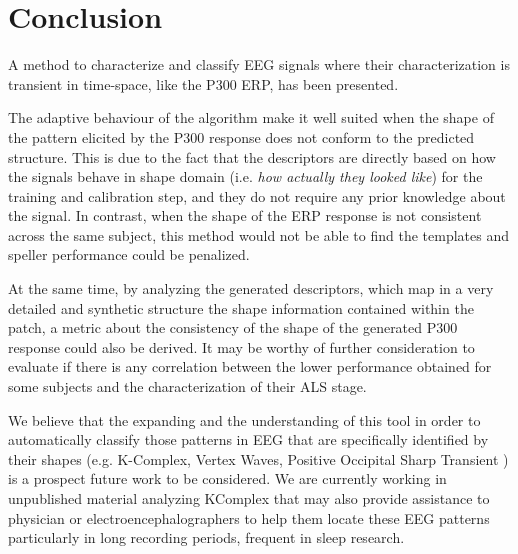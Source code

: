 \documentclass[entropy,article,submit,moreauthors,pdftex,10pt,a4paper]{mdpi}
\begin{document}
%
%
%
%
%
%
%
%

\section{Conclusion}

A method to characterize and classify EEG signals where their characterization is transient in time-space, like the P300 ERP, has been presented.   


The adaptive behaviour of the algorithm make it well suited when the shape of the pattern elicited by the P300 response does not conform to the predicted structure.  This is due to the fact that the descriptors are directly based on how the signals behave in shape domain (i.e. \textit{how actually they looked like}) for the training and calibration step, and they do not require any prior knowledge about the signal.   In contrast, when the shape of the ERP response is not consistent across the same subject, this method would not be able to find the templates and speller performance could be penalized.  

At the same time, by analyzing the generated descriptors, which map in a very detailed and synthetic structure the shape information contained within the patch, a metric about the consistency of the shape of the generated P300 response could also be derived.  It may be worthy of further consideration to evaluate if there is any correlation between the lower performance obtained for some subjects and the characterization of their ALS stage.

We believe that the expanding and the understanding of this tool in order to automatically classify those patterns in EEG that are specifically identified by their shapes (e.g. K-Complex, Vertex Waves, Positive Occipital Sharp Transient \citep{Hartman2005}) is a prospect future work to be considered. We are currently working in unpublished material analyzing KComplex that may also provide  assistance to physician or electroencephalographers to help them locate these EEG patterns particularly in long recording periods, frequent in sleep research.
\end{document}
